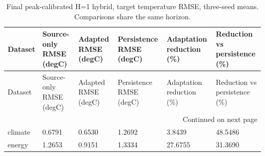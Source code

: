 {\footnotesize
\setlength{\tabcolsep}{3pt}
\renewcommand{\arraystretch}{1.17}
\begin{longtable}{@{}p{}p{}p{}p{}p{}p{}@{}}
\caption{Final peak-calibrated H=1 hybrid, target temperature RMSE, three-seed means. Comparisons share the same horizon.}\label{tab:rolling_headline}\\
\toprule
Dataset & Source-only RMSE (degC) & Adapted RMSE (degC) & Persistence RMSE (degC) & Adaptation reduction (\%) & Reduction vs persistence (\%) \\
\midrule\endfirsthead
Dataset & Source-only RMSE (degC) & Adapted RMSE (degC) & Persistence RMSE (degC) & Adaptation reduction (\%) & Reduction vs persistence (\%) \\
\midrule\endhead
\midrule\multicolumn{6}{r}{Continued on next page}\\\endfoot
\bottomrule\endlastfoot
climate & 0.6791 & 0.6530 & 1.2692 & 3.8439 & 48.5486 \\
energy & 1.2653 & 0.9151 & 1.3334 & 27.6755 & 31.3690 \\
\end{longtable}
}
